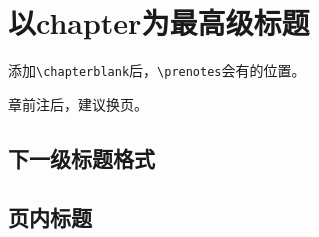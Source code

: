 \documentclass[10pt]{book}
\begin{document}
\pagestyle{mystyle}

\chapter{以chapter为最高级标题}

\chapterblank


添加\verb|\chapterblank|后，\verb|\prenotes|会有的位置。

\prenotesblank


章前注后，建议换页。

\newpage

\section{下一级标题格式}

\zhlipsum[3-4]

\section{页内标题}

\zhlipsum[1]
\end{document}
